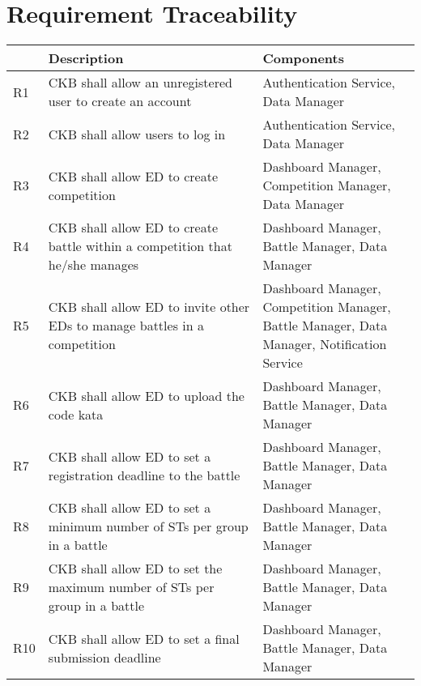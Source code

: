 %
\section{Requirement Traceability}
\label{s:requirement_traceability}%

\begin{center}
  \begin{longtable}{|p{0.05\linewidth}|p{0.55\linewidth}|p{0.4\linewidth}|}
        \hline
         & \textbf{Description} & \textbf{Components}\\
        \hline
        R1 & CKB shall allow an unregistered user to create an account &  Authentication Service, Data Manager\\
        \hline
        R2 & CKB shall allow users to log in &  Authentication Service, Data Manager\\
        \hline
        R3 & CKB shall allow ED to create competition & Dashboard Manager, Competition Manager, Data Manager \\
        \hline
        R4 & CKB shall allow ED to create battle within a competition that he/she manages &  Dashboard Manager, Battle Manager, Data Manager\\
        \hline
        R5 & CKB shall allow ED to invite other EDs to manage battles in a competition & Dashboard Manager, Competition Manager, Battle Manager, Data Manager, Notification Service\\
        \hline
        R6 & CKB shall allow ED to upload the code kata & Dashboard Manager, Battle Manager, Data Manager \\
        \hline
        R7 & CKB shall allow ED to set a registration deadline to the battle & Dashboard Manager, Battle Manager, Data Manager\\
        \hline
        R8 & CKB shall allow ED to set a minimum number of STs per group in a battle & Dashboard Manager, Battle Manager, Data Manager \\
        \hline
        R9 & CKB shall allow ED to set the maximum number of STs per group in a battle & Dashboard Manager, Battle Manager, Data Manager \\
        \hline
        R10 & CKB shall allow ED to set a final submission deadline & Dashboard Manager, Battle Manager, Data Manager \\

\end{longtable}
\end{center}
